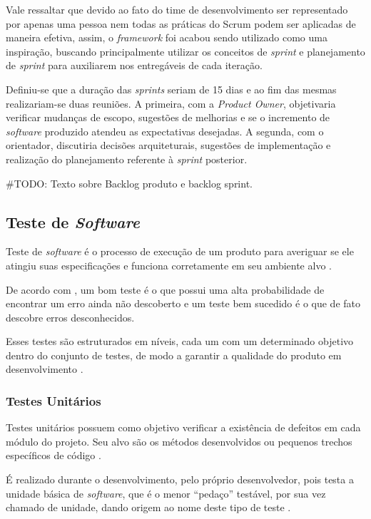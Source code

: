     Vale ressaltar que devido ao fato do time de desenvolvimento ser representado por apenas uma pessoa nem todas as práticas do Scrum podem ser aplicadas de maneira efetiva, assim, o \textit{framework} foi acabou sendo utilizado como uma inspiração, buscando principalmente utilizar
    os conceitos de \textit{sprint} e planejamento de \textit{sprint} para auxiliarem nos entregáveis de cada iteração.

    Definiu-se que a duração das \textit{sprints} seriam de 15 dias e ao fim das mesmas
    realizariam-se duas reuniões. A primeira, com a \textit{Product Owner}, objetivaria verificar mudanças de escopo, sugestões de melhorias e se o incremento de \textit{software} produzido atendeu as expectativas desejadas. A segunda,
    com o orientador, discutiria decisões arquiteturais, sugestões de implementação e realização
    do planejamento referente à \textit{sprint} posterior.

    \#TODO: Texto sobre Backlog produto e backlog sprint.

    \subsection{Teste de \textit{Software}}
    Teste de \textit{software} é o processo de execução de um produto para averiguar se ele atingiu suas especificações e funciona corretamente em seu ambiente alvo \cite{artigo_intro_teste}.

    De acordo com , um bom teste é o que possui uma alta probabilidade de encontrar um erro ainda não descoberto e um teste bem sucedido é o que de fato descobre erros desconhecidos.

    Esses testes são estruturados em níveis, cada um com um determinado objetivo dentro do conjunto de testes, de modo a garantir a qualidade do produto em desenvolvimento \cite{sw_test_tech}.

        \subsubsection{Testes Unitários}
        Testes unitários possuem como objetivo verificar a existência de defeitos em cada módulo do projeto. Seu alvo são os métodos desenvolvidos ou pequenos trechos específicos de código \cite{artigo_intro_teste}.

        É realizado durante o desenvolvimento, pelo próprio desenvolvedor, pois testa a unidade básica de \textit{software}, que é o menor ``pedaço''  testável, por sua vez chamado de unidade, dando origem ao nome deste tipo de teste \cite{sw_test_tech}.


